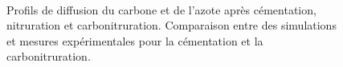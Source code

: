 \begin{figure}[!ht]
{	}\\
	\hfill
	
	\caption{\label{fig:diffusion_profiles}Profils de diffusion du carbone et de l'azote après cémentation, nitruration et carbonitruration. Comparaison entre des simulations et mesures expérimentales pour la cémentation et la carbonitruration.}
\end{figure}

